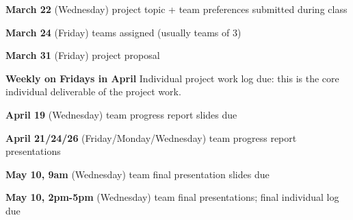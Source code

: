 \documentclass[12pt,letterpaper,answers]{exam}
\begin{document}
\begin{questions}








\end{questions}

\vfill

\noindent\textbf{March 22} (Wednesday) project topic + team preferences submitted during class

\noindent\textbf{March 24} (Friday) teams assigned (usually teams of 3)

\noindent\textbf{March 31} (Friday) project proposal

\noindent\textbf{Weekly on Fridays in April} Individual project work log due: this is the core individual deliverable of the project work.

\noindent\textbf{April 19} (Wednesday) team progress report slides due

\noindent\textbf{April 21/24/26} (Friday/Monday/Wednesday) team progress report presentations

\noindent\textbf{May 10, 9am} (Wednesday) team final presentation slides due

\noindent\textbf{May 10, 2pm-5pm} (Wednesday) team final presentations; final individual log due
\end{document}
